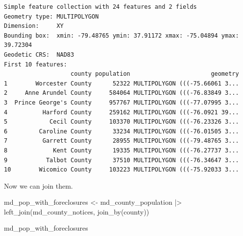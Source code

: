 \documentclass[
  letterpaper,
  DIV=11,
  numbers=noendperiod]{scrreprt}
\newenvironment{Shaded}{\begin{snugshade}}{\end{snugshade}}
\newcommand{\FunctionTok}[1]{\textcolor[rgb]{0.28,0.35,0.67}{#1}}
\newcommand{\NormalTok}[1]{\textcolor[rgb]{0.00,0.23,0.31}{#1}}
\newcommand{\OtherTok}[1]{\textcolor[rgb]{0.00,0.23,0.31}{#1}}
\newcommand{\SpecialCharTok}[1]{\textcolor[rgb]{0.37,0.37,0.37}{#1}}
\begin{document}
\begin{verbatim}
Simple feature collection with 24 features and 2 fields
Geometry type: MULTIPOLYGON
Dimension:     XY
Bounding box:  xmin: -79.48765 ymin: 37.91172 xmax: -75.04894 ymax: 39.72304
Geodetic CRS:  NAD83
First 10 features:
                   county population                       geometry
1        Worcester County      52322 MULTIPOLYGON (((-75.66061 3...
2     Anne Arundel County     584064 MULTIPOLYGON (((-76.83849 3...
3  Prince George's County     957767 MULTIPOLYGON (((-77.07995 3...
4          Harford County     259162 MULTIPOLYGON (((-76.0921 39...
5            Cecil County     103370 MULTIPOLYGON (((-76.23326 3...
6         Caroline County      33234 MULTIPOLYGON (((-76.01505 3...
7          Garrett County      28955 MULTIPOLYGON (((-79.48765 3...
8             Kent County      19335 MULTIPOLYGON (((-76.27737 3...
9           Talbot County      37510 MULTIPOLYGON (((-76.34647 3...
10        Wicomico County     103223 MULTIPOLYGON (((-75.92033 3...
\end{verbatim}

Now we can join them.

\begin{Shaded}
\begin{Highlighting}[]
\NormalTok{md\_pop\_with\_foreclosures }\OtherTok{\textless{}{-}}\NormalTok{ md\_county\_population }\SpecialCharTok{|\textgreater{}}
  \FunctionTok{left\_join}\NormalTok{(md\_county\_notices, }\FunctionTok{join\_by}\NormalTok{(county))}

\NormalTok{md\_pop\_with\_foreclosures}
\end{Highlighting}
\end{Shaded}
\end{document}
